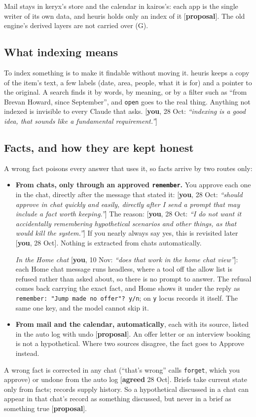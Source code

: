 \documentclass[10pt]{extarticle}
\newcommand{\you}[2]{{\small[\textbf{you}, #1: \textit{``#2''}]}}
\newcommand{\youx}[1]{{\small[\textbf{you}, #1]}}
\newcommand{\agreed}[1]{{\small[\textbf{agreed} #1]}}
\newcommand{\prop}{{\small[\textbf{proposal}]}}
\newcommand{\Sub}[1]{\subsection*{#1}}
\begin{document}
Mail stays in keryx's store and the calendar in kairos's: each app is the single writer of its own data, and heuris holds only an index of it \prop. The old engine's derived layers are not carried over (G).

\Sub{What indexing means}
To index something is to make it findable without moving it. heuris keeps a copy of the item's text, a few labels (date, area, people, what it is for) and a pointer to the original. A search finds it by words, by meaning, or by a filter such as ``from Brevan Howard, since September'', and \texttt{open} goes to the real thing. Anything not indexed is invisible to every Claude that asks. \you{28 Oct}{indexing is a good idea, that sounds like a fundamental requirement.}

\Sub{Facts, and how they are kept honest}
A wrong fact poisons every answer that uses it, so facts arrive by two routes only:
\begin{itemize}
\item \textbf{From chats, only through an approved \texttt{remember}.} You approve each one in the chat, directly after the message that stated it: \you{28 Oct}{should approve in chat quickly and easily, directly after I send a prompt that may include a fact worth keeping.} The reason: \you{28 Oct}{I do not want it accidentally remembering hypothetical scenarios and other things, as that would kill the system.} If you nearly always say yes, this is revisited later \youx{28 Oct}. Nothing is extracted from chats automatically.

\emph{In the Home chat} \you{10 Nov}{does that work in the home chat view}: each Home chat message runs headless, where a tool off the allow list is refused rather than asked about, so there is no prompt to answer. The refusal comes back carrying the exact fact, and Home shows it under the reply as \texttt{remember: "Jump made no offer"? y/n}; on \texttt{y} locus records it itself. The same one key, and the model cannot skip it.
\item \textbf{From mail and the calendar, automatically}, each with its source, listed in the auto log with undo \prop. An offer letter or an interview booking is not a hypothetical. Where two sources disagree, the fact goes to Approve instead.
\end{itemize}
A wrong fact is corrected in any chat (``that's wrong'' calls \texttt{forget}, which you approve) or undone from the auto log \agreed{28 Oct}. Briefs take current state only from facts; records supply history. So a hypothetical discussed in a chat can appear in that chat's record as something discussed, but never in a brief as something true \prop.
\end{document}
